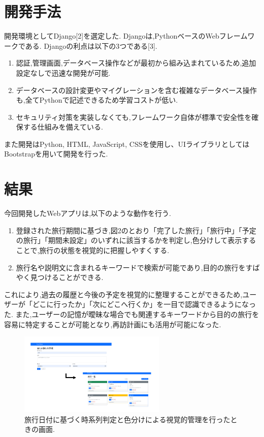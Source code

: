 \documentclass[a4j,twocolumn]{jsarticle}
\begin{document}
\section{開発手法}
\label{sec:org32eac9e}
開発環境としてDjango[2]を選定した.
Djangoは,PythonベースのWebフレームワークである.
Djangoの利点は以下の3つである[3].
\begin{enumerate}
\item 認証,管理画面,データベース操作などが最初から組み込まれているため,追加設定なしで迅速な開発が可能.
\item データベースの設計変更やマイグレーションを含む複雑なデータベース操作も,全てPythonで記述できるため学習コストが低い.
\item セキュリティ対策を実装しなくても,フレームワーク自体が標準で安全性を確保する仕組みを備えている.
\end{enumerate}
また開発はPython, HTML, JavaScript, CSSを使用し、UIライブラリとしてはBootstrapを用いて開発を行った.
\section{結果}
\label{sec:org200a809}
今回開発したWebアプリは,以下のような動作を行う.

\begin{enumerate}
\item 登録された旅行期間に基づき,図2のとおり「完了した旅行」「旅行中」「予定の旅行」「期間未設定」のいずれに該当するかを判定し,色分けして表示することで,旅行の状態を視覚的に把握しやすくする.
\item 旅行名や説明文に含まれるキーワードで検索が可能であり,目的の旅行をすばやく見つけることができる.
\end{enumerate}
これにより,過去の履歴と今後の予定を視覚的に整理することができるため,ユーザーが「どこに行ったか」「次にどこへ行くか」を一目で認識できるようになった.
また,ユーザーの記憶が曖昧な場合でも関連するキーワードから目的の旅行を容易に特定することが可能となり,再訪計画にも活用が可能になった.

\begin{figure}[htbp]
\centering
\includegraphics[width=7cm]{./figs/trip1.png}
\caption{\label{fig:orga301755}旅行日付に基づく時系列判定と色分けによる視覚的管理を行ったときの画面.}
\end{figure}
\end{document}
